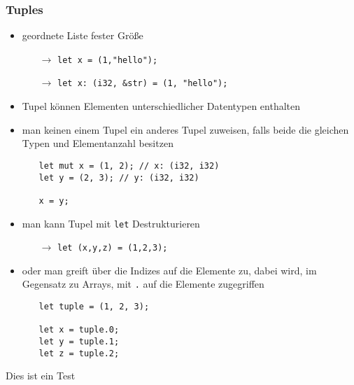 \documentclass[a4paper,12pt]{article}
\begin{document}
\subsubsection*{Tuples}
	\begin{itemize}
	  \item geordnete Liste fester Größe
	  \begin{itemize}
	      \item[$\rightarrow$] \verb|let x = (1,"hello");| 
		  \item[$\rightarrow$] \verb|let x: (i32, &str) = (1, "hello");| 
	  \end{itemize}
	  \item Tupel können Elementen unterschiedlicher Datentypen enthalten
	  \item man keinen einem Tupel ein anderes Tupel zuweisen, falls beide die gleichen Typen und Elementanzahl besitzen
	  \begin{itemize}
	  \item[]
\begin{verbatim}
let mut x = (1, 2); // x: (i32, i32)
let y = (2, 3); // y: (i32, i32)

x = y;
\end{verbatim}
	  \end{itemize}
	 \item man kann Tupel mit \verb|let| Destrukturieren 
	 \begin{itemize}
	     \item[$\rightarrow$] \verb|let (x,y,z) = (1,2,3);| 
	 \end{itemize}
	 \item oder man greift über die Indizes auf die Elemente zu, dabei wird, im Gegensatz zu Arrays, mit \verb|.| auf die Elemente zugegriffen
	 \begin{itemize}
	     \item[]
	     \begin{verbatim}
let tuple = (1, 2, 3);

let x = tuple.0;
let y = tuple.1;
let z = tuple.2;	     
		 \end{verbatim}	      
	 \end{itemize}
	\end{itemize}

Dies ist ein Test	
	
\end{document}

